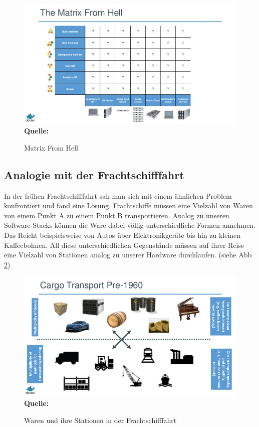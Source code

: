 \begin{figure}[htbp]
  \centering  
  \includegraphics[scale=0.7]{img/matrix_from_hell.jpg}\\
  \footnotesize\sffamily\textbf{Quelle:} \cite{hykes_docker_2013}
  \caption{Matrix From Hell}
  \label{fig:matrix_from_hell}
\end{figure}

\subsection{Analogie mit der Frachtschifffahrt}
\label{sec:analogie_mit_der_frachtschifffahrt}
In der frühen Frachtschifffahrt sah man sich mit einem ähnlichen Problem konfrontiert und fand eine Lösung. Frachtschiffe müssen eine Vielzahl von Waren von einem Punkt A zu einem Punkt B transportieren. Analog zu unseren Software-Stacks können die Ware dabei völlig unterschiedliche Formen annehmen. Das Reicht beispielsweise von Autos über Elektronikgeräte bis hin zu kleinen Kaffeebohnen. All diese unterschiedlichen Gegenstände müssen auf ihrer Reise eine Vielzahl von Stationen analog zu unserer Hardware durchlaufen. (siehe Abb \ref{fig:waren_stationen}) 
\begin{figure}[htbp]
  \centering  
  \includegraphics[scale=0.7]{img/waren_stationen.jpg}\\
  \footnotesize\sffamily\textbf{Quelle:} \cite{hykes_docker_2013}
  \caption{Waren und ihre Stationen in der Frachtschifffahrt}
  \label{fig:waren_stationen}
\end{figure}

